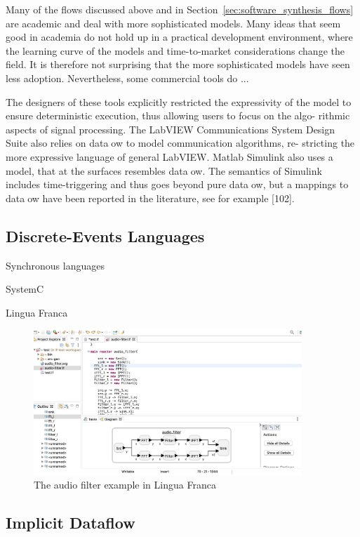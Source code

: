 Many of the flows discussed above and in Section~\ref{sec:software_synthesis_flows} are academic and deal with more sophisticated models. 
Many ideas that seem good in academia do not hold up in a practical development environment, where the learning curve of the models and time-to-market considerations change the field.
It is therefore not surprising that the more sophisticated models have seen less adoption.
Nevertheless, some commercial tools do ...


The designers of these tools explicitly restricted the expressivity of the model
to ensure deterministic execution, thus allowing users to focus on the algo-
rithmic aspects of signal processing. The LabVIEW Communications System
Design Suite also relies on dataow to model communication algorithms, re-
stricting the more expressive language of general LabVIEW. Matlab Simulink
also uses a model, that at the surfaces resembles dataow. The semantics of
Simulink includes time-triggering and thus goes beyond pure dataow, but a
mappings to dataow have been reported in the literature, see for example
[102].

\subsection{Discrete-Events Languages}

Synchronous languages

SystemC

Lingua Franca
\begin{figure}[t]
	\centering
	\includegraphics[width=0.9\textwidth]{figures/audio_filter_lf_screenshot.png}
	\caption{The audio filter example in Lingua Franca}
	\label{fig:audio_filter_lf}
\end{figure}


\subsection{Implicit Dataflow}


